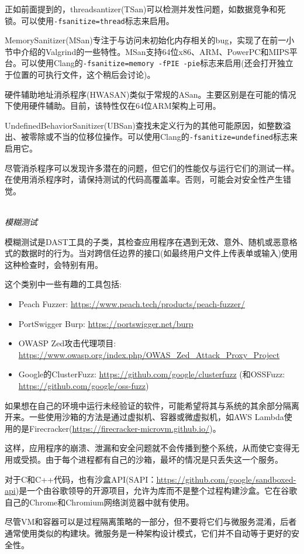 正如前面提到的，threadsantizer(TSan)可以检测并发性问题，如数据竞争和死锁。可以使用\texttt{-fsanitize=thread}标志来启用。

MemorySanitizer(MSan)专注于与访问未初始化内存相关的bug，实现了在前一小节中介绍的Valgrind的一些特性。MSan支持64位x86、ARM、PowerPC和MIPS平台。可以使用Clang的\texttt{-fsanitize=memory -fPIE -pie}标志来启用(还会打开独立于位置的可执行文件，这个稍后会讨论)。

硬件辅助地址消杀程序(HWASAN)类似于常规的ASan。主要区别是在可能的情况下使用硬件辅助。目前，该特性仅在64位ARM架构上可用。

UndefinedBehaviorSanitizer(UBSan)查找未定义行为的其他可能原因，如整数溢出、被零除或不当的位移位操作。可以使用Clang的\texttt{-fsanitize=undefined}标志来启用它。

尽管消杀程序可以发现许多潜在的问题，但它们的性能仅与运行它们的测试一样。在使用消杀程序时，请保持测试的代码高覆盖率。否则，可能会对安全性产生错觉。

\hspace*{\fill} \\ %
\noindent
\textit{模糊测试}

模糊测试是DAST工具的子类，其检查应用程序在遇到无效、意外、随机或恶意格式的数据时的行为。当对跨信任边界的接口(如最终用户文件上传表单或输入)使用这种检查时，会特别有用。

这个类别中一些有趣的工具包括:

\begin{itemize}
\item 
Peach Fuzzer: \url{https://www.peach.tech/products/peach-fuzzer/}

\item 
PortSwigger Burp: \url{https://portswigger.net/burp}

\item 
OWASP Zed攻击代理项目: \url{https://www.owasp.org/index.php/OWAS\_Zed\_Attack\_Proxy\_Project}

\item 
Google的ClusterFuzz: \url{https://github.com/google/clusterfuzz} (和OSSFuzz: \url{https://github.com/google/oss-fuzz})
\end{itemize}


如果想在自己的环境中运行未经验证的软件，可能希望将其与系统的其余部分隔离开来。一些使用沙箱的方法是通过虚拟机、容器或微虚拟机，如AWS Lambda使用的是Firecracker(\url{https://firecracker-microvm.github.io/})。

这样，应用程序的崩溃、泄漏和安全问题就不会传播到整个系统，从而使它变得无用或受损。由于每个进程都有自己的沙箱，最坏的情况是只丢失这一个服务。

对于C和C++代码，也有沙盒API(SAPI：\url{https://github.com/google/sandboxed-api})是一个由谷歌领导的开源项目，允许为库而不是整个过程构建沙盒。它在谷歌自己的Chrome和Chromium网络浏览器中就有使用。

尽管VM和容器可以是过程隔离策略的一部分，但不要将它们与微服务混淆，后者通常使用类似的构建块。微服务是一种架构设计模式，它们并不自动等于更好的安全性。

















